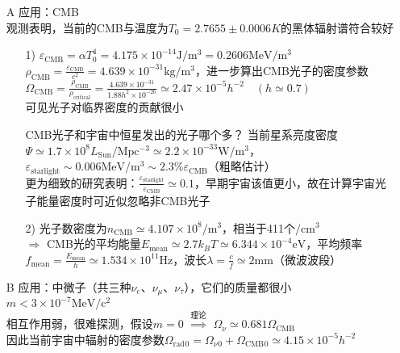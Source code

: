 \begin{itemize}
	\item[A] 应用：CMB \\
	观测表明，当前的CMB与温度为$T_0 = 2.7655 \pm 0.0006 K$的黑体辐射谱符合较好
	\begin{itemize}
		\item[1)] $\varepsilon_{\text{CMB}} = \alpha T_0^4 = 4.175 \times 10^{-14} \mathrm{J/m^3} = 0.2606 \mathrm{MeV/m^3}$ \\
		$\rho_{\text{CMB}} = \frac{\varepsilon_{\text{CMB}}}{c^2} = 4.639 \times 10^{-31} \mathrm{kg/m^3}$，进一步算出CMB光子的密度参数 \\
		$\Omega_{\text{CMB}} = \frac{\rho_{\text{CMB}}}{\rho_{\text{critical}}} = \frac{4.639 \times 10^{-31}}{1.88 h^2 \times 10^{-26}} \simeq 2.47\times 10^{-5} h^{-2} \quad (h \simeq 0.7)$ \\
		可见光子对临界密度的贡献很小
		\begin{cbox}
			{CMB光子和宇宙中恒星发出的光子哪个多？}
			当前星系亮度密度$\Psi \simeq 1.7 \times 10^{8} L_{\text{Sun}}/\mathrm{Mpc^{-3}} \simeq 2.2 \times 10^{-33} \mathrm{W/m^3}$，$\varepsilon_{\text{starlight}} \sim 0.006 \mathrm{MeV/m^3} \sim 2.3\% \varepsilon_{\text{CMB}}$（粗略估计） \\
			更为细致的研究表明：$\frac{\varepsilon_{\text{starlight}}}{\varepsilon_{\text{CMB}}} \simeq 0.1$，早期宇宙该值更小，故在计算宇宙光子能量密度时可近似忽略非CMB光子
		\end{cbox}
	
		\item[2)] 光子数密度为$n_{\text{CMB}} \simeq 4.107 \times 10^8 \mathrm{/m^3}$，相当于411个$\mathrm{/cm^3}$ \\
		$\Rightarrow$ CMB光的平均能量$E_{\text{mean}} \simeq 2.7 k_B T \simeq 6.344 \times 10^{-4} \mathrm{eV}$，平均频率$f_{\text{mean}} = \frac{E_{\text{mean}}}{h} \simeq 1.534 \times 10^{11} \mathrm{Hz}$，波长$\lambda = \frac{c}{f} \simeq 2 \mathrm{mm}$（微波波段）
	\end{itemize}

	\item[B] 应用：中微子（共三种$\nu_{e}$、$\nu_{\mu}$、$\nu_{\tau}$），它们的质量都很小$m < 3 \times 10^{-7} \mathrm{MeV/c^2}$ \\
	相互作用弱，很难探测，假设$m=0$ $\stackrel{\text{理论}}{\Longrightarrow}$ $\Omega_{\nu} \simeq 0.681 \Omega_{\text{CMB}}$ \\
	因此当前宇宙中辐射的密度参数$\Omega_{\text{rad}}{}_0 = \Omega_{\nu}{}_0 + \Omega_{\text{CMB}}{}_{0} \simeq 4.15 \times 10^{-5} h^{-2}$
\end{itemize}

